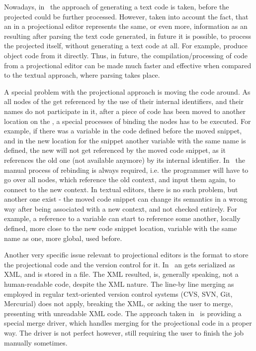   Nowadays, in \jbmps\ the approach of generating a text code is taken, before the projected  could be further processed.
  However, taken into account the fact, that an  in a projectional editor represents the same, or even more, information 
  as an  resulting after parsing the text code generated, in future it is possible, to process the projected  itself,
  without generating a text code at all. For example, produce object code from it directly. Thus, in future, the compilation/processing
  of code from a projectional editor can be made much faster and effective when compared to the textual approach, where parsing takes place.
 
  A special problem with the projectional approach is moving the code around. As all nodes of the  get referenced by the use of their
  internal identifiers, and their names do not participate in it, after a piece of code has been moved to another location on the , 
  a special processes of binding the nodes has to be executed. For example, if there was a variable  in the code defined before the moved snippet,
  and in the new location for the snippet another variable with the same name  is defined, the new  will not get referenced by the 
  moved code snippet, as it references the old one (not available anymore) by its internal identifier. In \jbmps\ the manual process of rebinding is
  always required, i.e. the programmer will have to go over all nodes, which reference the old context, and input them again, to connect to the
  new context. In textual editors, there is no such problem, but another one exist - the moved code snippet can change its semantics in a wrong way
  after being associated with a new context, and not checked entirely. For example, a reference to a variable can start to reference some another, 
  locally defined, more close to the new code snippet location, variable with the same name as one, more global, used before. 
  
  Another very specific issue relevant to projectional editors is the format to store the projectional code and the version control for it.
  In \jbmps\ an  gets serialized as XML, and is stored in a file. The XML resulted, is, generally speaking, not a human-readable 
  code, despite the XML nature. The line-by line merging as employed in regular text-oriented version control systems (CVS, SVN, Git, Mercurial)
  does not apply, breaking the XML, or asking the user to merge, presenting with unreadable XML code. The approach taken in \jbmps\ is providing
  a special merge driver, which handles merging for the projectional code in a proper way. The driver is not perfect however, still requiring 
  the user to finish the job manually sometimes. 
  
